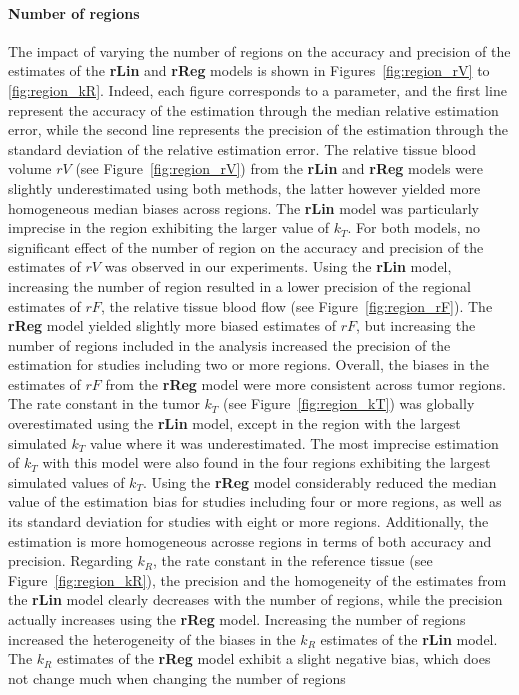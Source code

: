 \paragraph{Number of regions}
The impact of varying the number of regions on the accuracy and precision of the estimates of the \textbf{rLin} and \textbf{rReg} models is shown in Figures~\ref{fig:region_rV} to \ref{fig:region_kR}.
Indeed, each figure corresponds to a parameter, and the first line represent the accuracy of the estimation through the median relative estimation error, while the second line represents the precision of the estimation through the standard deviation of the relative estimation error.
The relative tissue blood volume $rV$ (see Figure~\ref{fig:region_rV}) from the \textbf{rLin} and \textbf{rReg} models were slightly underestimated using both methods, the latter however yielded more homogeneous median biases across regions.
The \textbf{rLin} model was particularly imprecise in the region exhibiting the larger value of $k_T$.
For both models, no significant effect of the number of region on the accuracy and precision of the estimates of $rV$ was observed in our experiments.
Using the \textbf{rLin} model, increasing the number of region resulted in a lower precision of the regional estimates of $rF$, the relative tissue blood flow (see Figure~\ref{fig:region_rF}).
The \textbf{rReg} model yielded slightly more biased estimates of $rF$, but increasing the number of regions included in the analysis increased the precision of the estimation for studies including two or more regions.
Overall, the biases in the estimates of $rF$ from the \textbf{rReg} model were more consistent across tumor regions.
The rate constant in the tumor $k_T$ (see Figure~\ref{fig:region_kT}) was globally overestimated using the \textbf{rLin} model, except in the region with the largest simulated $k_T$ value where it was underestimated.
The most imprecise estimation of $k_T$ with this model were also found in the four regions exhibiting the largest simulated values of $k_T$.
Using the \textbf{rReg} model considerably reduced the median value of the estimation bias for studies including four or more regions, as well as its standard deviation for studies with eight or more regions.
Additionally, the estimation is more homogeneous acrosse regions in terms of both accuracy and precision.
Regarding $k_R$, the rate constant in the reference tissue (see Figure~\ref{fig:region_kR}), the precision and the homogeneity of the estimates from the \textbf{rLin} model clearly decreases with the number of regions, while the precision actually increases using the \textbf{rReg} model. 
Increasing the number of regions increased the heterogeneity of the biases in the $k_R$ estimates of the \textbf{rLin} model.
The $k_R$ estimates of the \textbf{rReg} model exhibit a slight negative bias, which does not change much when changing the number of regions

